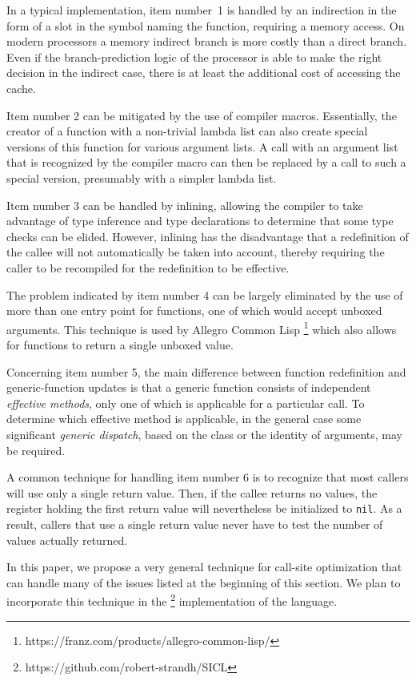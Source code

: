 In a typical \commonlisp{} implementation, item number~1 is handled by
an indirection in the form of a slot in the symbol naming the
function, requiring a memory access.  On modern processors a memory
indirect branch is more costly than a direct branch.  Even if the
branch-prediction logic of the processor is able to make the right
decision in the indirect case, there is at least the additional cost
of accessing the cache.

Item number 2 can be mitigated by the use of compiler macros.
Essentially, the creator of a function with a non-trivial lambda list
can also create special versions of this function for various argument
lists.  A call with an argument list that is recognized by the
compiler macro can then be replaced by a call to such a special
version, presumably with a simpler lambda list.

Item number 3 can be handled by inlining, allowing the compiler to
take advantage of type inference and type declarations to determine
that some type checks can be elided.  However, inlining has the
disadvantage that a redefinition of the callee will not automatically
be taken into account, thereby requiring the caller to be recompiled for
the redefinition to be effective.

The problem indicated by item number 4 can be largely eliminated by
the use of more than one entry point for functions, one of which would
accept unboxed arguments.  This technique is used by Allegro Common
Lisp%
\footnote{https://franz.com/products/allegro-common-lisp/} which also
allows for functions to return a single unboxed value.

Concerning item number 5, the main difference between function
redefinition and generic-function updates is that a generic function
consists of independent \emph{effective methods}, only one of which is
applicable for a particular call.  To determine which effective method
is applicable, in the general case some significant \emph{generic
  dispatch}, based on the class or the identity of arguments, may be
required.

A common technique for handling item number 6 is to recognize that
most callers will use only a single return value.  Then, if the callee
returns no values, the register holding the first return value will
nevertheless be initialized to \texttt{nil}.  As a result, callers
that use a single return value never have to test the number of
values actually returned.

In this paper, we propose a very general technique for call-site
optimization that can handle many of the issues listed at the
beginning of this section.  We plan to incorporate this technique in
the \sicl{}%
\footnote{https://github.com/robert-strandh/SICL}
implementation of the \commonlisp{} language.

